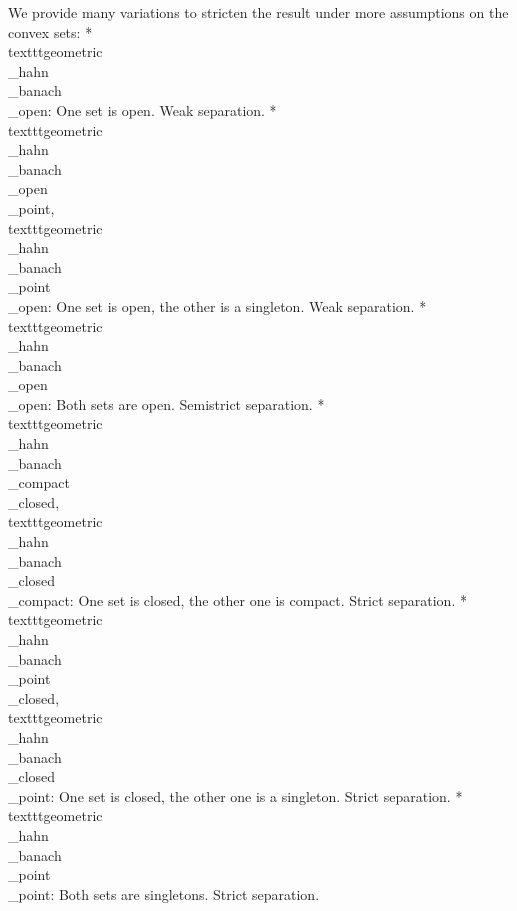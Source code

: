 \documentclass{article}
\theoremstyle{definition}
\begin{document}
We provide many variations to stricten the result under more assumptions on the convex sets:
* \\texttt{geometric\\_hahn\\_banach\\_open}: One set is open. Weak separation.
* \\texttt{geometric\\_hahn\\_banach\\_open\\_point}, \\texttt{geometric\\_hahn\\_banach\\_point\\_open}: One set is open, the
  other is a singleton. Weak separation.
* \\texttt{geometric\\_hahn\\_banach\\_open\\_open}: Both sets are open. Semistrict separation.
* \\texttt{geometric\\_hahn\\_banach\\_compact\\_closed}, \\texttt{geometric\\_hahn\\_banach\\_closed\\_compact}: One set is closed,
  the other one is compact. Strict separation.
* \\texttt{geometric\\_hahn\\_banach\\_point\\_closed}, \\texttt{geometric\\_hahn\\_banach\\_closed\\_point}: One set is closed, the
  other one is a singleton. Strict separation.
* \\texttt{geometric\\_hahn\\_banach\\_point\\_point}: Both sets are singletons. Strict separation.
\end{document}
